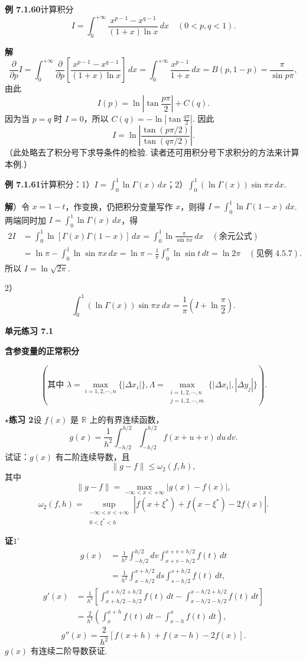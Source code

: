 \documentclass[UTF8,12pt,a4paper,fontset=fandol]{ctexart}
\begin{document}
\noindent\textbf{例 7.1.60}\quad 计算积分
\[
I=\int_0^{+\infty}\frac{x^{p-1}-x^{q-1}}{(1+x)\ln x}\,dx\quad(0<p,q<1).
\]

\noindent\textbf{解}\quad
\[
\frac{\partial}{\partial p}I
=\int_0^{+\infty}\frac{\partial}{\partial p}
\left[\frac{x^{p-1}-x^{q-1}}{(1+x)\ln x}\right]\,dx
=\int_0^{+\infty}\frac{x^{p-1}}{1+x}\,dx
=B(p,1-p)=\frac{\pi}{\sin p\pi},
\]
由此
\[
I(p)=\ln\left|\tan\frac{p\pi}{2}\right|+C(q).
\]
因为当 $p=q$ 时 $I=0$，所以 $C(q)=-\ln\left|\tan\frac{q\pi}{2}\right|$. 因此
\[
I=\ln\left|\frac{\tan(p\pi/2)}{\tan(q\pi/2)}\right|.
\]
（此处略去了积分号下求导条件的检验. 读者还可用积分号下求积分的方法来计算本例.）

\noindent\textbf{例 7.1.61}\quad 计算积分：1）$I=\displaystyle\int_0^1\ln\Gamma(x)\,dx$；2）$\displaystyle\int_0^1(\ln\Gamma(x))\sin\pi x\,dx$.

\noindent\textbf{解}）令 $x=1-t$，作变换，仍把积分变量写作 $x$，则得 $I=\displaystyle\int_0^1\ln\Gamma(1-x)\,dx$. 两端同时加 $I=\displaystyle\int_0^1\ln\Gamma(x)\,dx$，得
\[
\begin{aligned}
2I&=\int_0^1\ln[\Gamma(x)\Gamma(1-x)]\,dx
=\int_0^1\ln\frac{\pi}{\sin\pi x}\,dx\quad(\text{余元公式})\\
&=\ln\pi-\int_0^1\ln\sin\pi x\,dx
=\ln\pi-\frac1\pi\int_0^\pi\ln\sin t\,dt
=\ln2\pi\quad(\text{见例 4.5.7}).
\end{aligned}
\]
所以 $I=\ln\sqrt{2\pi}$.

2）
\[
\int_0^1(\ln\Gamma(x))\sin\pi x\,dx
=\frac1\pi\left(I+\ln\frac\pi2\right).
\]

\noindent\textbf{单元练习 7.1}

\noindent\textbf{含参变量的正常积分}



\[
\left(\text{其中 }\lambda=\max_{i=1,2,\cdots,n}\{|\Delta x_i|\},
\Lambda=\max_{\substack{i=1,2,\cdots,n\\ j=1,2,\cdots,m}}\{|\Delta x_i|,|\Delta y_j|\}\right).
\]

\noindent\textbf{$\star$练习 2}\quad 设 $f(x)$ 是 $\mathbb R$ 上的有界连续函数，
\[
g(x)=\frac1{h^2}\int_{-h/2}^{h/2}\int_{-h/2}^{h/2}f(x+u+v)\,du\,dv.
\]
试证：$g(x)$ 有二阶连续导数，且
\[
\|g-f\|\le\omega_2(f,h),
\]
其中
\[
\|g-f\|=\max_{-\infty<x<+\infty}|g(x)-f(x)|,
\]
\[
\omega_2(f,h)=\sup_{\substack{-\infty<x<+\infty\\ 0<\xi^*<h}}
|f(x+\xi^*)+f(x-\xi^*)-2f(x)|.
\]

\noindent\textbf{证}\quad $1^\circ$
\[
\begin{aligned}
g(x)&=\frac1{h^2}\int_{-h/2}^{h/2}dv\int_{x+v-h/2}^{x+v+h/2}f(t)\,dt\\
&=\frac1{h^2}\int_{x-h/2}^{x+h/2}ds\int_{s-h/2}^{s+h/2}f(t)\,dt,
\end{aligned}
\]
\[
\begin{aligned}
g'(x)
&=\frac1{h^2}\left[\int_{x+h/2-h/2}^{x+h/2+h/2}f(t)\,dt
-\int_{x-h/2-h/2}^{x-h/2+h/2}f(t)\,dt\right]\\
&=\frac2{h^2}\left(\int_x^{x+h}f(t)\,dt-\int_{x-h}^x f(t)\,dt\right),
\end{aligned}
\]
\[
g''(x)=\frac2{h^2}[f(x+h)+f(x-h)-2f(x)].
\]
$g(x)$ 有连续二阶导数获证.
\end{document}
